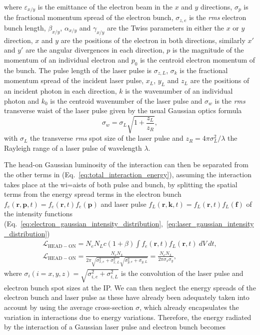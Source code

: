 \documentclass[../main.tex]{subfiles}
\begin{document}
where $\varepsilon_{x/y}$ is the emittance of the electron beam in the $x$ and $y$ directions, $\sigma_{p}$ is the fractional momentum spread of the electron bunch, $\sigma_{z,e}$ is the \textit{rms} electron bunch length, $\beta_{x/y}$, $\alpha_{x/y}$ and $\gamma_{x/y}$ are the Twiss parameters in either the $x$ or $y$ direction, $x$ and $y$ are the positions of the electron in both directions, similarly $x'$ and $y'$ are the angular divergences in each direction, $p$ is the magnitude of the momentum of an individual electron and $p_{0}$ is the centroid electron momentum of the bunch. The pulse length of the laser pulse is $\sigma_{z,L}$, $\sigma_{k}$ is the fractional momentum spread of the incident laser pulse, $x_{L}$, $y_{L}$ and $z_{L}$ are the positions of an incident photon in each direction, $k$ is the wavenumber of an individual photon and $k_{0}$ is the centroid wavenumber of the laser pulse and $\sigma_{w}$ is the \textit{rms} transverse waist of the laser pulse given by the usual Gaussian optics formula  \cite{siegmann1986lasers}
\begin{equation}
\sigma_{w} = \sigma_{L}\sqrt{1+\frac{z_{L}}{z_{R}}},
\label{eq:laser_waist}    
\end{equation}
with $\sigma_{L}$ the transverse \textit{rms} spot size of the laser pulse and $z_{R} = 4\pi\sigma_{L}^{2}/\lambda$ the Rayleigh range \cite{siegmann1986lasers} of a laser pulse of wavelength $\lambda$.

The head-on Gaussian luminosity of the interaction can then be separated from the other terms in (Eq.~\ref{eq:total_interaction_energy}), assuming the interaction takes place at the wi=aists of both pulse and bunch, by splitting the spatial terms from the energy spread terms in the electron bunch $f_{e}\left(\mathbf{r},\mathbf{p},t\right) = f_{e}\left(\mathbf{r},t\right)f_{e}\left(\mathbf{p}\right)$ and laser pulse $f_{L}\left(\mathbf{r},\mathbf{k},t\right) = f_{L}\left(\mathbf{r},t\right)f_{L}\left(\mathbf{f}\right)$ of the intensity functions (Eq.~\ref{eq:electron_gaussian_intensity_distribution},~\ref{eq:laser_gaussian_intensity_distribution}) 
\begin{gather}
\mathcal{L}_{\mathrm{HEAD-ON}} = N_{e}N_{L}c\left(1+\beta\right)\int f_{e}\left(\mathbf{r},t\right)f_{L}\left(\mathbf{r},t\right)~dV~dt, \\
\mathcal{L}_{\mathrm{HEAD-ON}} = \frac{N_{e}N_{L}}{2\pi\sqrt{\sigma_{x,e}^{2}+\sigma_{x,L}^{2}}\sqrt{\sigma_{y,e}^{2}+\sigma_{y,L}}} = \frac{N_{e}N_{L}}{2\pi\sigma_{x}\sigma_{y}},
\label{eq:headon_luminosity}
\end{gather}
where $\sigma_{i}(i=x,y,z) = \sqrt{\sigma_{i,e}^{2}+\sigma_{i,L}^{2}}$ is the convolution of the laser pulse and electron bunch spot sizes at the IP. We can then neglect the energy spreads of the electron bunch and laser pulse as these have already been adequately taken into account by using the average cross-section $\sigma$, which already encapsulates the variation in interactions due to energy variations. Therefore, the energy radiated by the interaction of a Gaussian laser pulse and electron bunch becomes  
\end{document}
